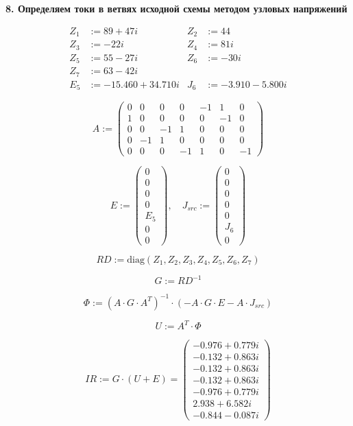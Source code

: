 \documentclass{article}
\begin{document}
\textbf{8. Определяем токи в ветвях исходной схемы методом узловых напряжений}

\begin{align*}
Z_1 &:= 89 + 47i & Z_2 &:= 44 \\
Z_3 &:= -22i & Z_4 &:= 81i \\
Z_5 &:= 55 - 27i & Z_6 &:= -30i \\
Z_7 &:= 63 - 42i \\
E_5 &:= -15.460 + 34.710i & J_6 &:= -3.910 - 5.800i
\end{align*}

\[
A := \begin{pmatrix} 
0 & 0 & 0 & 0 & -1 & 1 & 0 \\ 
1 & 0 & 0 & 0 & 0 & -1 & 0 \\ 
0 & 0 & -1 & 1 & 0 & 0 & 0 \\ 
0 & -1 & 1 & 0 & 0 & 0 & 0 \\ 
0 & 0 & 0 & -1 & 1 & 0 & -1 
\end{pmatrix}
\]

\[
E := \begin{pmatrix} 0 \\ 0 \\ 0 \\ 0 \\ E_5 \\ 0 \\ 0 \end{pmatrix}, \quad 
J_{src} := \begin{pmatrix} 0 \\ 0 \\ 0 \\ 0 \\ 0 \\ J_6 \\ 0 \end{pmatrix}
\]

\[
RD := \text{diag}(Z_1, Z_2, Z_3, Z_4, Z_5, Z_6, Z_7)
\]

\[
G := RD^{-1}
\]

\[
\Phi := (A \cdot G \cdot A^T)^{-1} \cdot (-A \cdot G \cdot E - A \cdot J_{src})
\]

\[
U := A^T \cdot \Phi
\]

\[
IR := G \cdot (U + E) = \begin{pmatrix} 
-0.976 + 0.779i \\ 
-0.132 + 0.863i \\ 
-0.132 + 0.863i \\ 
-0.132 + 0.863i \\ 
-0.976 + 0.779i \\ 
2.938 + 6.582i \\ 
-0.844 - 0.087i 
\end{pmatrix}
\]
\end{document}
